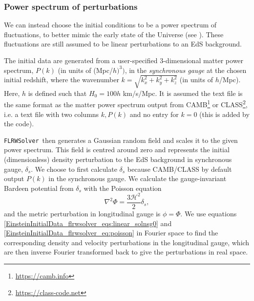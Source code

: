 \subsubsection{Power spectrum of perturbations}\label{EinsteinInitialData_flrwsolver_sec:pspec_ics}

We can instead choose the initial conditions to be a power spectrum of fluctuations, to better mimic the early state of the Universe (see \cite{EinsteinInitialData_flrwsolver_macpherson2019}). 
These fluctuations are still assumed to be linear perturbations to an EdS background. 

The initial data are generated from a user-specified 3-dimensional matter power spectrum, $P(k)$ (in units of (Mpc/$h)^3)$, in the \textit{synchronous gauge} at the chosen initial redshift, where the wavenumber $k=\sqrt{k_x^2+k_y^2+k_z^2}$ (in units of $h$/Mpc). Here, $h$ is defined such that $H_0 = 100 h$ km/s/Mpc. It is assumed the text file is the same format as the matter power spectrum output from CAMB\footnote{\url{https://camb.info}} or CLASS\footnote{\url{https://class-code.net}}, i.e. a text file with two columns $k, P(k)$ and no entry for $k=0$ (this is added by the code). 

\texttt{FLRWSolver}\ then generates a Gaussian random field and scales it to the given power spectrum. This field is centred around zero and represents the initial (dimensionless) density perturbation to the EdS background in synchronous gauge, $\delta_s$. We choose to first calculate $\delta_s$ because CAMB/CLASS by default output $P(k)$ in the synchronous gauge. We calculate the gauge-invariant Bardeen potential from $\delta_s$ with the Poisson equation
\begin{equation}\label{EinsteinInitialData_flrwsolver_eq:poisson}
	\nabla^2 \Phi = \frac{3\mathcal{H}^2}{2}\delta_s,
\end{equation}
and the metric perturbation in longitudinal gauge is $\phi=\Phi$. We use equations \eqref{EinsteinInitialData_flrwsolver_eqs:linear_solnsg0} and \eqref{EinsteinInitialData_flrwsolver_eq:poisson} in Fourier space to find the corresponding density and velocity perturbations in the longitudinal gauge, which are then inverse Fourier transformed back to give the perturbations in real space.

